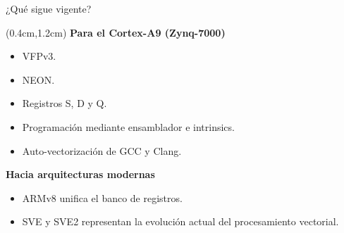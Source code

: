 \begin{frame}{¿Qué sigue vigente?}
 \begin{textblock*}{\textwidth}(0.4cm,1.2cm)\justifying
  \textbf{Para el Cortex-A9 (Zynq-7000)}
  \begin{itemize}
   \item VFPv3.
   \item NEON.
   \item Registros S, D y Q.
   \item Programación mediante ensamblador e intrinsics.
   \item Auto-vectorización de GCC y Clang.
  \end{itemize}

  \vspace{0.4cm}

  \textbf{Hacia arquitecturas modernas}

  \begin{itemize}
   \item ARMv8 unifica el banco de registros.
   \item SVE y SVE2 representan la evolución actual del procesamiento vectorial.
  \end{itemize}
 \end{textblock*}
\end{frame}

